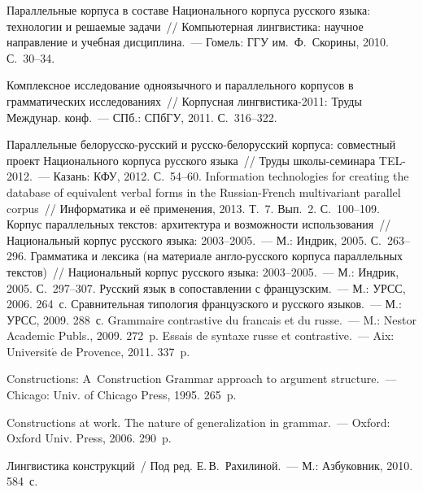 \begin{multicols}{2}
{{\begin{thebibliography}{99}
 Параллельные корпуса в составе Национального корпуса русского языка:
технологии и решаемые задачи~// Компьютерная лингвистика: научное
направление и учебная дисциплина.~--- Гомель: ГГУ им.\ Ф.~Скорины, 2010.
С.~30--34.

 Комплексное исследование одноязычного и параллельного корпусов в
грамматических исследованиях~// Корпусная лингвистика-2011: Труды
Междунар. конф.~--- СПб.: СПбГУ, 2011. С.~316--322.

 Параллельные бе\-ло\-рус\-ско-рус\-ский и русско-белорусский корпуса: совместный
проект Национального корпуса русского языка~// Труды шко\-лы-се\-ми\-на\-ра
TEL-2012.~--- Казань: КФУ, 2012. С.~54--60.
 Information technologies for creating the database of equivalent verbal forms in the
Russian-French multivariant parallel corpus~// Информатика и её применения,
2013. Т.~7. Вып.~2. С.~100--109.
 Корпус параллельных текстов: архитектура и возможности использования~//
Национальный корпус русского языка: 2003--2005.~--- М.: Индрик, 2005.
С.~263--296.
 Грамматика и лексика (на материале анг\-ло-рус\-ско\-го корпуса параллельных
текстов)~// Национальный корпус русского языка: 2003--2005.~--- М.: Индрик,
2005. С.~297--307.
 Русский язык в сопоставлении с французским.~--- М.: УРСС, 2006. 264~с.
 Сравнительная типология французского и русского языков.~--- М.: УРСС,
2009. 288~с.
 Grammaire contrastive du francais et du russe.~--- M.: Nestor Academic Publs.,
2009. 272~p.
Essais de syntaxe russe et contrastive.~--- Aix: Universit$\acute{\mbox{e}}$ de
Provence, 2011. 337~p.


Constructions: A~Construction Grammar approach to argument structure.~---
Chicago: Univ. of Chicago Press, 1995. 265~p.

Constructions at work. The nature of generalization in grammar.~---
 Oxford: Oxford Univ. Press, 2006. 290~p.

Лингвистика конструкций~/ Под ред. Е.\,В.~Рахилиной.~--- М.: Азбуковник,
2010. 584~с.


\end{thebibliography}}}
\end{multicols}
